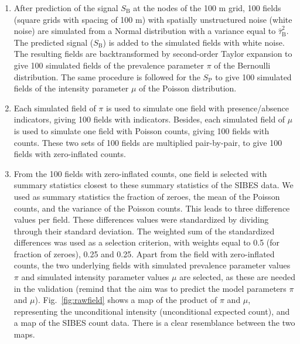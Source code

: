 \documentclass[review]{elsarticle}
\begin{document}
\begin{enumerate}
\item
After prediction of the signal $S_{\mathrm{B}}$ at the nodes of the 100 m grid, 100 fields (square grids with spacing of 100 m) with spatially unstructured noise (white noise) are simulated from a Normal distribution with a variance equal to $\hat{\tau}^2_{\mathrm{B}}$. The predicted signal ($S_{\mathrm{B}}$) is added to the simulated fields with white noise. The resulting fields are backtransformed by second-order Taylor expansion to give 100 simulated fields of the prevalence parameter $\pi$ of the Bernoulli distribution. The same procedure is followed for the $S_{\mathrm{P}}$ to give 100 simulated fields of the intensity parameter $\mu$ of the Poisson distribution.

\item
Each simulated field of $\pi$ is used to simulate one field with presence/absence indicators, giving 100 fields with indicators. Besides, each simulated field of $\mu$ is used to simulate one field with Poisson counts, giving 100 fields with counts. These two sets of 100 fields are multiplied pair-by-pair, to give 100 fields with zero-inflated counts.

\item
From the 100 fields with zero-inflated counts, one field is selected with summary statistics closest to these summary statistics of the SIBES data. We used as summary statistics the fraction of zeroes, the mean of the Poisson counts, and the variance of the Poisson counts. This leads to three difference values per field. These differences values were standardized by dividing through their standard deviation. The weighted sum of the standardized differences was used as a selection criterion, with weights equal to 0.5 (for fraction of zeroes), 0.25 and 0.25. Apart from the field with zero-inflated counts, the two underlying fields with simulated prevalence parameter values $\pi$ and simulated intensity parameter values $\mu$ are selected, as these are needed in the validation (remind that the aim was to predict the model parameters $\pi$ and $\mu$). Fig.~\ref{fig:rawfield} shows a map of the product of $\pi$ and $\mu$, representing the unconditional intensity (unconditional expected count), and a map of the SIBES count data. There is a clear resemblance between the two maps.


\end{enumerate}
\end{document}

